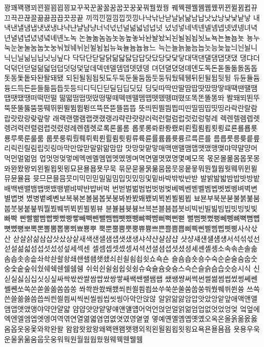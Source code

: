 꽝꽤꽥꽹꾀꾄꾈꾐꾑꾕꾜꾸꾹꾼꿀꿇꿈꿉꿋꿍꿎꿔꿜꿨꿩
꿰꿱꿴꿸뀀뀁뀄뀌뀐뀔뀜뀝뀨끄끅끈끊끌끎끓끔끕끗끙끝
끼끽낀낄낌낍낏낑나낙낚난낟날낡낢남납낫났낭낮낯낱낳
내낵낸낼냄냅냇냈냉냐냑냔냘냠냥너넉넋넌널넒넓넘넙넛
넜넝넣네넥넨넬넴넵넷넸넹녀녁년녈념녑녔녕녘녜녠노녹
논놀놂놈놉놋농높놓놔놘놜놨뇌뇐뇔뇜뇝뇟뇨뇩뇬뇰뇹뇻
뇽누눅눈눋눌눔눕눗눙눠눴눼뉘뉜뉠뉨뉩뉴뉵뉼늄늅늉느
늑는늘늙늚늠늡늣능늦늪늬늰늴니닉닌닐닒님닙닛닝닢다
닥닦단닫달닭닮닯닳담답닷닸당닺닻닿대댁댄댈댐댑댓댔
댕댜더덕덖던덛덜덞덟덤덥덧덩덫덮데덱덴델뎀뎁뎃뎄뎅
뎌뎐뎔뎠뎡뎨뎬도독돈돋돌돎돐돔돕돗동돛돝돠돤돨돼됐
되된될됨됩됫됴두둑둔둘둠둡둣둥둬뒀뒈뒝뒤뒨뒬뒵뒷뒹
듀듄듈듐듕드득든듣들듦듬듭듯등듸디딕딘딛딜딤딥딧딨
딩딪따딱딴딸땀땁땃땄땅땋때땍땐땔땜땝땟땠땡떠떡떤떨
떪떫떰떱떳떴떵떻떼떽뗀뗄뗌뗍뗏뗐뗑뗘뗬또똑똔똘똥똬
똴뙈뙤뙨뚜뚝뚠뚤뚫뚬뚱뛔뛰뛴뛸뜀뜁뜅뜨뜩뜬뜯뜰뜸뜹
뜻띄띈띌띔띕띠띤띨띰띱띳띵라락란랄람랍랏랐랑랒랖랗
래랙랜랠램랩랫랬랭랴략랸럇량러럭런럴럼럽럿렀렁렇레
렉렌렐렘렙렛렝려력련렬렴렵렷렸령례롄롑롓로록론롤롬
롭롯롱롸롼뢍뢨뢰뢴뢸룀룁룃룅료룐룔룝룟룡루룩룬룰룸
룹룻룽뤄뤘뤠뤼뤽륀륄륌륏륑류륙륜률륨륩륫륭르륵른를
름릅릇릉릊릍릎리릭린릴림립릿링마막만많맏말맑맒맘맙
맛망맞맡맣매맥맨맬맴맵맷맸맹맺먀먁먈먕머먹먼멀멂멈
멉멋멍멎멓메멕멘멜멤멥멧멨멩며멱면멸몃몄명몇몌모목
몫몬몰몲몸몹못몽뫄뫈뫘뫙뫼묀묄묍묏묑묘묜묠묩묫무묵
묶문묻물묽묾뭄뭅뭇뭉뭍뭏뭐뭔뭘뭡뭣뭬뮈뮌뮐뮤뮨뮬뮴
뮷므믄믈믐믓미믹민믿밀밂밈밉밋밌밍및밑바박밖밗반받
발밝밞밟밤밥밧방밭배백밴밸뱀뱁뱃뱄뱅뱉뱌뱍뱐뱝버벅
번벋벌벎범법벗벙벚베벡벤벧벨벰벱벳벴벵벼벽변별볍볏
볐병볕볘볜보복볶본볼봄봅봇봉봐봔봤봬뵀뵈뵉뵌뵐뵘뵙
뵤뵨부북분붇불붉붊붐붑붓붕붙붚붜붤붰붸뷔뷕뷘뷜뷩뷰
뷴뷸븀븃븅브븍븐블븜븝븟비빅빈빌빎빔빕빗빙빚빛빠빡
빤빨빪빰빱빳빴빵빻빼빽뺀뺄뺌뺍뺏뺐뺑뺘뺙뺨뻐뻑뻔뻗
뻘뻠뻣뻤뻥뻬뼁뼈뼉뼘뼙뼛뼜뼝뽀뽁뽄뽈뽐뽑뽕뾔뾰뿅뿌
뿍뿐뿔뿜뿟뿡쀼쁑쁘쁜쁠쁨쁩삐삑삔삘삠삡삣삥사삭삯산
삳살삵삶삼삽삿샀상샅새색샌샐샘샙샛샜생샤샥샨샬샴샵
샷샹섀섄섈섐섕서석섞섟선섣설섦섧섬섭섯섰성섶세섹센
셀셈셉셋셌셍셔셕션셜셤셥셧셨셩셰셴셸솅소속솎손솔솖
솜솝솟송솥솨솩솬솰솽쇄쇈쇌쇔쇗쇘쇠쇤쇨쇰쇱쇳쇼쇽숀
숄숌숍숏숑수숙순숟술숨숩숫숭숯숱숲숴쉈쉐쉑쉔쉘쉠쉥
쉬쉭쉰쉴쉼쉽쉿슁슈슉슐슘슛슝스슥슨슬슭슴습슷승시식
신싣실싫심십싯싱싶싸싹싻싼쌀쌈쌉쌌쌍쌓쌔쌕쌘쌜쌤쌥
쌨쌩썅써썩썬썰썲썸썹썼썽쎄쎈쎌쏀쏘쏙쏜쏟쏠쏢쏨쏩쏭
쏴쏵쏸쐈쐐쐤쐬쐰쐴쐼쐽쑈쑤쑥쑨쑬쑴쑵쑹쒀쒔쒜쒸쒼쓩
쓰쓱쓴쓸쓺쓿씀씁씌씐씔씜씨씩씬씰씸씹씻씽아악안앉않
알앍앎앓암압앗았앙앝앞애액앤앨앰앱앳앴앵야약얀얄얇
얌얍얏양얕얗얘얜얠얩어억언얹얻얼얽얾엄업없엇었엉엊
엌엎에엑엔엘엠엡엣엥여역엮연열엶엷염엽엾엿였영옅옆
옇예옌옐옘옙옛옜오옥온올옭옮옰옳옴옵옷옹옻와왁완왈
왐왑왓왔왕왜왝왠왬왯왱외왹왼욀욈욉욋욍요욕욘욜욤욥
욧용우욱운울욹욺움웁웃웅워웍원월웜웝웠웡웨웩웬웰웸
